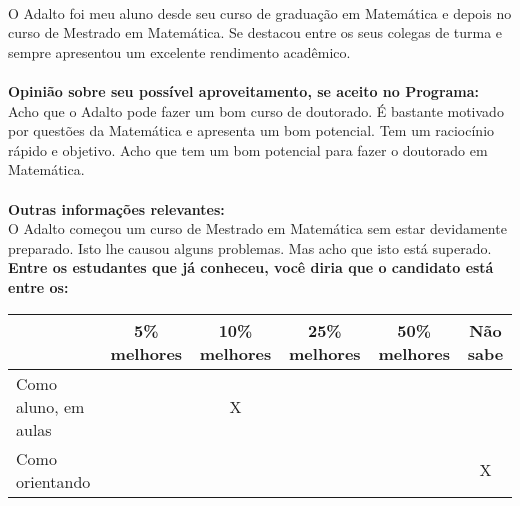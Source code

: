 \documentclass[11pt]{article}
\begin{document}
\\O Adalto foi meu aluno desde seu curso de graduação em Matemática e depois no curso de Mestrado em Matemática. Se destacou entre os seus colegas de turma e sempre apresentou um excelente rendimento acadêmico. \\
\\
\textbf{Opinião sobre seu possível aproveitamento, se aceito no Programa:}
\\Acho que o Adalto pode fazer um bom curso de doutorado. É bastante motivado por questões da Matemática e apresenta um bom potencial. Tem um raciocínio rápido e objetivo. Acho que tem um bom potencial para fazer o doutorado em Matemática.\\ 
\\
\textbf{Outras informações relevantes:} \\O Adalto começou um curso de Mestrado em Matemática sem estar devidamente preparado. Isto lhe causou alguns problemas. Mas acho que isto está superado. 
\\[0.3cm]
\textbf{Entre os estudantes que já conheceu, você diria que o candidato está entre os:}
\\
\begin{tabular}{|l|c|c|c|c|c|}
\hline
 & 5\% melhores & 10\% melhores & 25\% melhores & 50\% melhores & Não sabe \\
\hline
Como aluno, em aulas &  & X &  &  & \\
\hline
Como orientando &  &  &  &  & X\\
\hline
\end{tabular}
\end{document}
